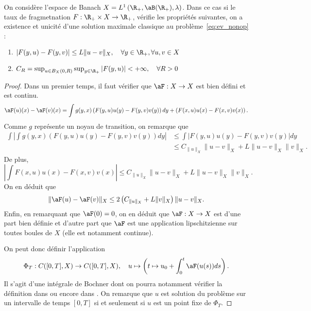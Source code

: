 \begin{prop}{}{}
	On considère l'espace de Banach $X = L^1\left(\R_+, \aB(\R_+),\lambda\right)$. Dans ce cas si le taux de fragmetnation $F : \R_+ \times X \to \R_+$, vérifie les propriétés suivantes, on a existence et unicité d'une solution maximale classique au problème~\ref{eq:ev_nonop} :
	\begin{enumerate}
		\item $|F(y, u) - F(y,v)| \le L \|u-v\|_X, \quad \forall y \in \R_+, \forall u,v \in X$ \\
		\item $C_R = \sup_{u \in B_X(0,R)} \sup_{y \in \R_+}|F(y,u)| < +\infty, \quad \forall R >0$
	\end{enumerate}
\end{prop}

\begin{proof}
	Dans un premier temps, il faut vérifier que $\aF : X \to X$ est bien défini et est continu.
	\[
		\aF(u)(x) - \aF(v)(x) = \int g(y,x) \left(F(y,u)u(y) - F(y,v)v(y)\right) dy+
		\left(F(x,u)u(x) - F(x,v)v(x) \right).
	\]
	Comme $g$ représente un noyau de transition, on remarque que
	\begin{align*}
		\int \left|\int g(y,x) \left(F(y,u)u(y) - F(y,v)v(y)\right) dy\right| & \le
		\int  \left|F(y,u)u(y) - F(y,v)v(y)\right| dy                               \\
		                                                                      & \le
		C_{\|u\|_X} \|u-v\|_X + L \|u-v\|_X \|v\|_X.
	\end{align*}
	De plus,
	\[
		\left|\int F(x,u)u(x) - F(x,v)v(x) \right| \le
		C_{\|u\|_X} \|u-v\|_X + L \|u-v\|_X \|v\|_X.
	\]
	On en déduit que
	\[
		\|\aF(u) - \aF(v)\|_X \le 2 \left( C_{\|u\|_X} + L \|v\|_X \right) \|u-v\|_X.
	\]
	Enfin, en remarquant que $\aF(0) = 0$, on en déduit que $\aF : X \to X$ est d'une part bien définie et d'autre part que $\aF$ est une application lipschitzienne sur toutes boules de $X$ (elle est notamment continue).

	On peut donc définir l'application
	\[
		\Phi_T : C([0,T], X) \to C([0,T], X), \quad u
		\mapsto \left(t \mapsto  u_0 + \int_0^t \aF(u(s)) ds\right).
	\]
	Il s'agit d'une intégrale de Bochner dont on pourra notamment vérifier la définition dans \cite{bochner} ou encore dans \cite{semigroup}. On remarque que $u$ est solution du problème sur un intervalle de temps $[0,T]$ si et seulement si $u$ est un point fixe de $\Phi_T$.


\end{proof}
